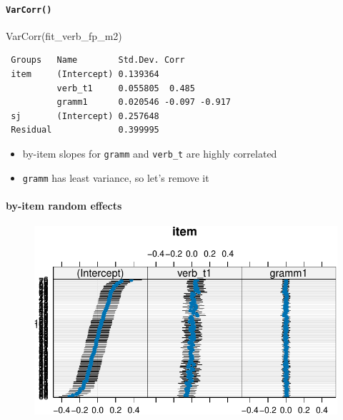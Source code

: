 \documentclass[
  letterpaper,
  DIV=11,
  numbers=noendperiod]{scrartcl}
\let\oldparagraph\paragraph
\renewcommand{\paragraph}[1]{\oldparagraph{#1}\mbox{}}
\newenvironment{Shaded}{\begin{snugshade}}{\end{snugshade}}
\newcommand{\FunctionTok}[1]{\textcolor[rgb]{0.28,0.35,0.67}{#1}}
\newcommand{\NormalTok}[1]{\textcolor[rgb]{0.00,0.23,0.31}{#1}}
\newcommand{\SpecialCharTok}[1]{\textcolor[rgb]{0.37,0.37,0.37}{#1}}
\providecommand{\tightlist}{%
  \setlength{\itemsep}{0pt}\setlength{\parskip}{0pt}}\usepackage{longtable,booktabs,array}
\begin{document}
\hypertarget{varcorr-1}{%
\paragraph{\texorpdfstring{\texttt{VarCorr()}}{VarCorr()}}\label{varcorr-1}}

\begin{Shaded}
\begin{Highlighting}[]
\FunctionTok{VarCorr}\NormalTok{(fit\_verb\_fp\_m2)}
\end{Highlighting}
\end{Shaded}

\begin{verbatim}
 Groups   Name        Std.Dev. Corr         
 item     (Intercept) 0.139364              
          verb_t1     0.055805  0.485       
          gramm1      0.020546 -0.097 -0.917
 sj       (Intercept) 0.257648              
 Residual             0.399995              
\end{verbatim}

\begin{itemize}
\tightlist
\item
  by-item slopes for \texttt{gramm} and \texttt{verb\_t} are highly
  correlated
\item
  \texttt{gramm} has least variance, so let's remove it
\end{itemize}

\hypertarget{by-item-random-effects-1}{%
\paragraph{by-item random effects}\label{by-item-random-effects-1}}

\begin{Shaded}
\end{Shaded}

\begin{figure}[H]

{\centering \includegraphics{12-model_selection_example_files/figure-pdf/unnamed-chunk-31-1.pdf}

}

\end{figure}
\end{document}
